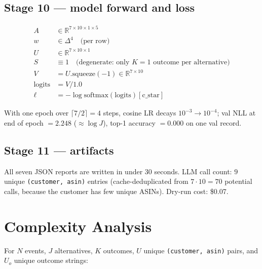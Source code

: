 \documentclass[11pt,a4paper]{article}
\begin{document}
\subsection{Stage 10 — model forward and loss}

\begin{equation*}
\begin{aligned}
A &\in \mathbb{R}^{7 \times 10 \times 1 \times 5} \\
w &\in \Delta^4 \quad \text{(per row)} \\
U &\in \mathbb{R}^{7 \times 10 \times 1} \\
S &\equiv 1 \quad \text{(degenerate: only $K=1$ outcome per alternative)} \\
V &= U.\mathrm{squeeze}(-1) \in \mathbb{R}^{7 \times 10} \\
\text{logits} &= V / 1.0 \\
\ell &= -\log \mathrm{softmax}(\text{logits})[\text{c\_star}]
\end{aligned}
\end{equation*}

With one epoch over $\lceil 7/2 \rceil = 4$ steps, cosine LR decays
$10^{-3} \to 10^{-4}$; val NLL at end of epoch $= 2.248$
($\approx \log J$), top-1 accuracy $= 0.000$ on one val record.

\subsection{Stage 11 — artifacts}

All seven JSON reports are written in under 30 seconds. LLM call
count: $9$ unique \texttt{(customer, asin)} entries
(cache-deduplicated from $7 \cdot 10 = 70$ potential calls, because
the customer has few unique ASINs). Dry-run cost: \$0.07.

\section{Complexity Analysis}
\label{sec:complexity}

For $N$ events, $J$ alternatives, $K$ outcomes, $U$ unique
\texttt{(customer, asin)} pairs, and $U_o$ unique outcome strings:
\end{document}
